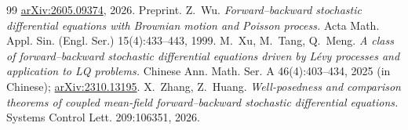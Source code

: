 \begin{thebibliography}{99}
  \href{https://arxiv.org/abs/2605.09374}{arXiv:2605.09374}, 2026. Preprint.
 Z.~Wu.
  \emph{Forward--backward stochastic differential equations with Brownian motion and
  Poisson process.} Acta Math. Appl. Sin. (Engl. Ser.) 15(4):433--443, 1999.
 M.~Xu, M.~Tang, Q.~Meng.
  \emph{A class of forward--backward stochastic differential equations driven by L\'evy
  processes and application to LQ problems.}
  Chinese Ann. Math. Ser. A 46(4):403--434, 2025 (in Chinese);
  \href{https://arxiv.org/abs/2310.13195}{arXiv:2310.13195}.
 X.~Zhang, Z.~Huang.
  \emph{Well-posedness and comparison theorems of coupled mean-field forward--backward
  stochastic differential equations.} Systems Control Lett. 209:106351, 2026.
\end{thebibliography}

